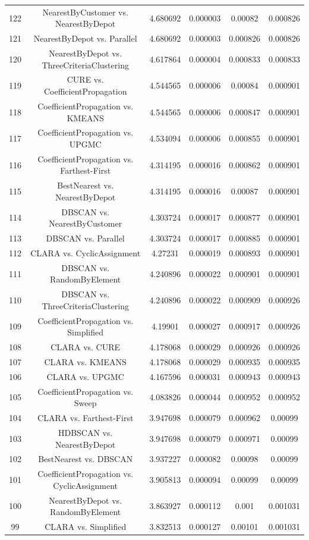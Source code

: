 \documentclass[a4paper,10pt]{article}
\begin{document}
\begin{landscape}
\begin{table}[!htp]
\begin{tabular}{cccccc}
122&NearestByCustomer vs. NearestByDepot&4.680692&0.000003&0.00082&0.000826\\
121&NearestByDepot vs. Parallel&4.680692&0.000003&0.000826&0.000826\\
120&NearestByDepot vs. ThreeCriteriaClustering&4.617864&0.000004&0.000833&0.000833\\
119&CURE vs. CoefficientPropagation&4.544565&0.000006&0.00084&0.000901\\
118&CoefficientPropagation vs. KMEANS&4.544565&0.000006&0.000847&0.000901\\
117&CoefficientPropagation vs. UPGMC&4.534094&0.000006&0.000855&0.000901\\
116&CoefficientPropagation vs. Farthest-First&4.314195&0.000016&0.000862&0.000901\\
115&BestNearest vs. NearestByDepot&4.314195&0.000016&0.00087&0.000901\\
114&DBSCAN vs. NearestByCustomer&4.303724&0.000017&0.000877&0.000901\\
113&DBSCAN vs. Parallel&4.303724&0.000017&0.000885&0.000901\\
112&CLARA vs. CyclicAssignment&4.27231&0.000019&0.000893&0.000901\\
111&DBSCAN vs. RandomByElement&4.240896&0.000022&0.000901&0.000901\\
110&DBSCAN vs. ThreeCriteriaClustering&4.240896&0.000022&0.000909&0.000926\\
109&CoefficientPropagation vs. Simplified&4.19901&0.000027&0.000917&0.000926\\
108&CLARA vs. CURE&4.178068&0.000029&0.000926&0.000926\\
107&CLARA vs. KMEANS&4.178068&0.000029&0.000935&0.000935\\
106&CLARA vs. UPGMC&4.167596&0.000031&0.000943&0.000943\\
105&CoefficientPropagation vs. Sweep&4.083826&0.000044&0.000952&0.000952\\
104&CLARA vs. Farthest-First&3.947698&0.000079&0.000962&0.00099\\
103&HDBSCAN vs. NearestByDepot&3.947698&0.000079&0.000971&0.00099\\
102&BestNearest vs. DBSCAN&3.937227&0.000082&0.00098&0.00099\\
101&CoefficientPropagation vs. CyclicAssignment&3.905813&0.000094&0.00099&0.00099\\
100&NearestByDepot vs. RandomByElement&3.863927&0.000112&0.001&0.001031\\
99&CLARA vs. Simplified&3.832513&0.000127&0.00101&0.001031\\

\end{tabular}
\end{table}
\end{landscape}
\end{document}
